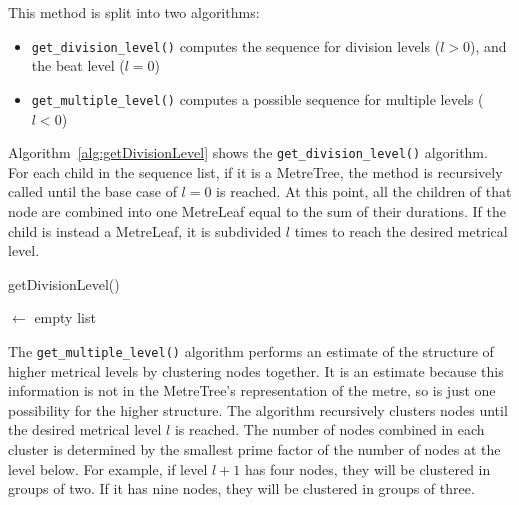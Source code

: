 \documentclass[12pt,twoside,openright]{report}
\begin{document}
This method is split into two algorithms:
\begin{itemize}
    \item \verb'get_division_level()' computes the sequence for division levels ($l>0$), and the beat level ($l=0$)
	\item \verb'get_multiple_level()' computes a possible sequence for multiple levels ($l<0$)
\end{itemize}

Algorithm~\ref{alg:getDivisionLevel} shows the \verb'get_division_level()' algorithm. For each child in the
sequence list, if it is a MetreTree, the method is recursively called until the
base case of $l=0$ is reached. At this point, all the children of that node are
combined into one MetreLeaf equal to the sum of their durations. If the child is
instead a MetreLeaf, it is subdivided $l$ times to reach the desired metrical
level.

\begin{algorithm}[H]

    \caption{getDivisionLevel()}
    \BlankLine

    \NewSequence $\gets$ empty list\;
    \label{alg:getDivisionLevel}
\end{algorithm}

The \verb'get_multiple_level()' algorithm performs an estimate of the structure of
higher metrical levels by clustering nodes together. It is an estimate because this information is not in the
MetreTree's representation of the metre, so is just one possibility for the higher structure. The algorithm recursively clusters nodes until
the desired metrical level $l$ is reached. The number of nodes combined in each cluster is
determined by the smallest prime factor of the number of nodes at the level below. For
example, if level $l+1$ has four nodes, they will be clustered in groups of two. If it
has nine nodes, they will be clustered in groups of three.
\end{document}
